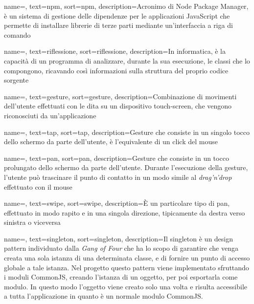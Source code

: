 {
    name=,
    text=npm,
    sort=npm,
    description={Acronimo di Node Package Manager, è un sistema di gestione delle dipendenze per le applicazioni JavaScript che permette di installare librerie di terze parti mediante un'interfaccia a riga di comando}
}

{
    name=,
    text=riflessione,
    sort=riflessione,
    description={In informatica, è la capacità di un programma di analizzare, durante la sua esecuzione, le classi che lo compongono, ricavando così informazioni sulla struttura del proprio codice sorgente}
}
    
{
    name=,
    text=gesture,
    sort=gesture,
    description={Combinazione di movimenti dell'utente effettuati con le dita su un dispositivo touch-screen, che vengono riconosciuti da un'applicazione}
}

{
    name=,
    text=tap,
    sort=tap,
    description={Gesture che consiste in un singolo tocco dello schermo da parte dell'utente, è l'equivalente di un click del mouse}
}

{
    name=,
    text=pan,
    sort=pan,
    description={Gesture che consiste in un tocco prolungato dello schermo da parte dell'utente. Durante l'esecuzione della gesture, l'utente può trascinare il punto di contatto in un modo simile al \textit{drag'n'drop} effettuato con il mouse}
}

{
    name=,
    text=swipe,
    sort=swipe,
    description={\`E un particolare tipo di pan, effettuato in modo rapito e in una singola direzione, tipicamente da destra verso sinistra o viceversa}
}

{
    name=,
    text=singleton,
    sort=singleton,
    description={Il singleton è un design pattern individuato dalla \textit{Gang of Four} che ha lo scopo di garantire che venga creata una sola istanza di una determinata classe, e di fornire un punto di accesso globale a tale istanza.
     Nel progetto questo pattern viene implementato sfruttando i moduli CommonJS, creando l'istanza di un oggetto, per poi esportarla come modulo. In questo modo l'oggetto viene creato solo una volta e risulta accessibile a tutta l'applicazione in quanto è un normale modulo CommonJS.
    }
}


